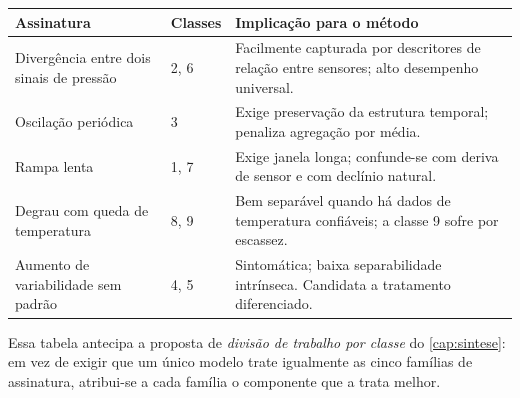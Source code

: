 \begin{center}
\small
\begin{tabular}{p{3.4cm} p{2.0cm} p{7.2cm}}
\toprule
\textbf{Assinatura} & \textbf{Classes} & \textbf{Implicação para o método} \\
\midrule
Divergência entre dois sinais de pressão & 2, 6 & Facilmente capturada por
descritores de relação entre sensores; alto desempenho universal. \\[0.3em]
Oscilação periódica & 3 & Exige preservação da estrutura temporal; penaliza
agregação por média. \\[0.3em]
Rampa lenta & 1, 7 & Exige janela longa; confunde-se com deriva de sensor e com
declínio natural. \\[0.3em]
Degrau com queda de temperatura & 8, 9 & Bem separável quando há dados de
temperatura confiáveis; a classe 9 sofre por escassez. \\[0.3em]
Aumento de variabilidade sem padrão & 4, 5 & Sintomática; baixa separabilidade
intrínseca. Candidata a tratamento diferenciado. \\
\bottomrule
\end{tabular}
\end{center}

Essa tabela antecipa a proposta de \emph{divisão de trabalho por classe} do
\cref{cap:sintese}: em vez de exigir que um único modelo trate igualmente as cinco
famílias de assinatura, atribui-se a cada família o componente que a trata melhor.


